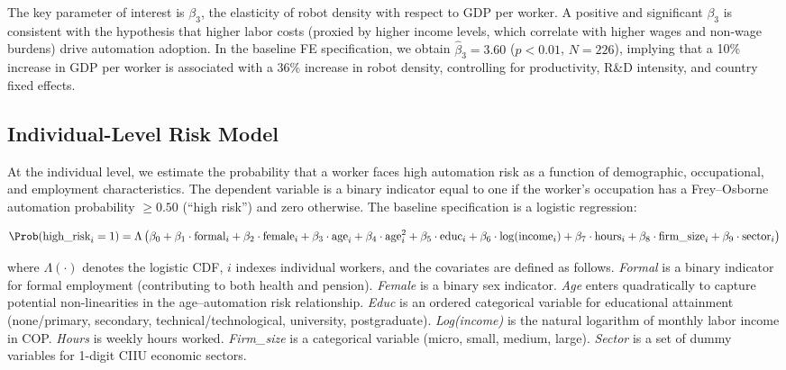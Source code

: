 The key parameter of interest is $\beta_3$, the elasticity of robot density with respect to GDP per worker. A positive and significant $\beta_3$ is consistent with the hypothesis that higher labor costs (proxied by higher income levels, which correlate with higher wages and non-wage burdens) drive automation adoption. In the baseline FE specification, we obtain $\hat{\beta}_3 = 3.60$ ($p < 0.01$, $N = 226$), implying that a 10\% increase in GDP per worker is associated with a 36\% increase in robot density, controlling for productivity, R\&D intensity, and country fixed effects.


\subsection{Individual-Level Risk Model}
\label{subsec:individual_model}

At the individual level, we estimate the probability that a worker faces high automation risk as a function of demographic, occupational, and employment characteristics. The dependent variable is a binary indicator equal to one if the worker's occupation has a Frey--Osborne automation probability $\geq 0.50$ (``high risk'') and zero otherwise. The baseline specification is a logistic regression:

\begin{equation}
\Prob(\text{high\_risk}_i = 1) = \Lambda\left(\beta_0 + \beta_1 \cdot \text{formal}_i + \beta_2 \cdot \text{female}_i + \beta_3 \cdot \text{age}_i + \beta_4 \cdot \text{age}_i^2 + \beta_5 \cdot \text{educ}_i + \beta_6 \cdot \log(\text{income}_i) + \beta_7 \cdot \text{hours}_i + \beta_8 \cdot \text{firm\_size}_i + \beta_9 \cdot \text{sector}_i\right)
\label{eq:logit}
\end{equation}

\noindent where $\Lambda(\cdot)$ denotes the logistic CDF, $i$ indexes individual workers, and the covariates are defined as follows. \textit{Formal} is a binary indicator for formal employment (contributing to both health and pension). \textit{Female} is a binary sex indicator. \textit{Age} enters quadratically to capture potential non-linearities in the age--automation risk relationship. \textit{Educ} is an ordered categorical variable for educational attainment (none/primary, secondary, technical/technological, university, postgraduate). \textit{Log(income)} is the natural logarithm of monthly labor income in COP. \textit{Hours} is weekly hours worked. \textit{Firm\_size} is a categorical variable (micro, small, medium, large). \textit{Sector} is a set of dummy variables for 1-digit CIIU economic sectors.

